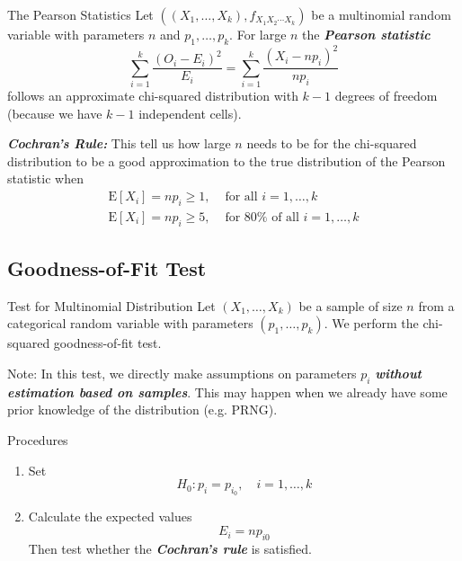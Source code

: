 \documentclass{beamer}
\newcommand{\bb}[1]{\textcolor{antiquefuchsia}{\textbf{\textit{#1}}}}
\begin{document}
\begin{frame}{The Pearson Statistics}
Let $\left(\left(X_{1}, \ldots, X_{k}\right), f_{X_{1} X_{2} \cdots X_{k}}\right)$ be a multinomial random variable with parameters $n$ and $p_{1}, \ldots, p_{k}$. For large $n$ the \bb{Pearson statistic}
$$
\sum_{i=1}^{k} \frac{\left(O_{i}-E_{i}\right)^{2}}{E_{i}}=\sum_{i=1}^{k} \frac{\left(X_{i}-n p_{i}\right)^{2}}{n p_{i}}
$$
follows an approximate chi-squared distribution with $k-1$ degrees of freedom (because we have $k-1$ independent cells).

\bb{Cochran's Rule:} This tell us how large $n$ needs to be for the chi-squared distribution to be a good approximation to the true distribution of the Pearson statistic when
$$
\begin{array}{ll}
\mathrm{E}\left[X_{i}\right]=n p_{i} \geq 1, & \text { for all } i=1, \ldots, k \\
\mathrm{E}\left[X_{i}\right]=n p_{i} \geq 5, & \text { for } 80 \% \text { of all } i=1, \ldots, k
\end{array}
$$
\end{frame}



\subsection{Goodness-of-Fit Test}
\begin{frame}{Test for Multinomial Distribution}
Let $\left(X_{1}, \ldots, X_{k}\right)$ be a sample of size $n$ from a categorical random variable with parameters $\left(p_{1}, \ldots, p_{k}\right)$. We perform the chi-squared goodness-of-fit test.

Note: In this test, we directly make assumptions on parameters $p_{i}$ \bb{without estimation based on samples}. This may happen when we already have some prior knowledge of the distribution (e.g. PRNG).
\begin{block}{Procedures}
\begin{enumerate}
\item Set
$$
H_{0}: p_{i}=p_{i_{0}}, \quad i=1, \ldots, k
$$
\item Calculate the expected values
$$
E_{i}=n p_{i 0}
$$
Then test whether the \bb{Cochran's rule} is satisfied.
\end{enumerate}
\end{block}
\end{frame}
\end{document}

